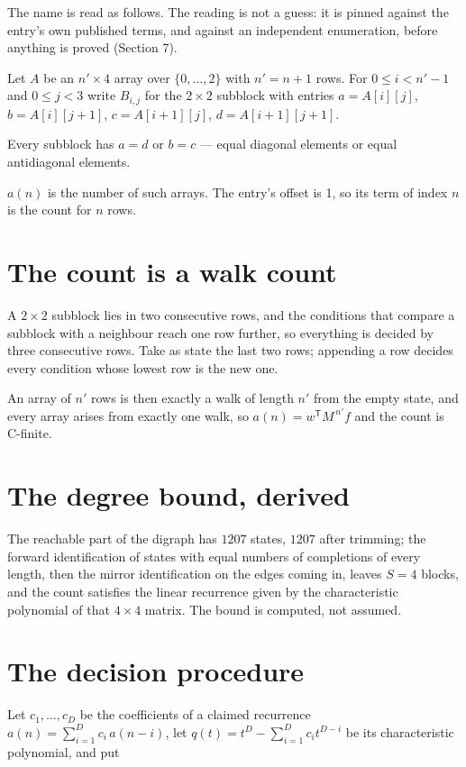 \documentclass[11pt]{article}
\theoremstyle{definition}
\begin{document}
The name is read as follows. The reading is not a guess: it is pinned against the entry's own published terms, and against an independent enumeration, before anything is proved (Section 7).

Let $A$ be an $n' \times 4$ array over $\{0,\dots,2\}$ with $n' = n + 1$ rows. For $0 \le i < n'-1$ and $0 \le j < 3$ write $B_{i,j}$ for the $2\times2$ subblock with entries $a = A[i][j]$, $b = A[i][j{+}1]$, $c = A[i{+}1][j]$, $d = A[i{+}1][j{+}1]$.

Every subblock has $a = d$ or $b = c$ --- equal diagonal elements or equal antidiagonal elements.

$a(n)$ is the number of such arrays. The entry's offset is 1, so its term of index $n$ is the count for $n$ rows.

\section{The count is a walk count}

A $2\times2$ subblock lies in two consecutive rows, and the conditions that compare a subblock with a neighbour reach one row further, so everything is decided by three consecutive rows. Take as state the last two rows; appending a row decides every condition whose lowest row is the new one.

An array of $n'$ rows is then exactly a walk of length $n'$ from the empty state, and every array arises from exactly one walk, so $a(n) = w^{\mathsf T}M^{\,n'}f$ and the count is C-finite.

\section{The degree bound, derived}

The reachable part of the digraph has $1207$ states, $1207$ after trimming; the forward identification of states with equal numbers of completions of every length, then the mirror identification on the edges coming in, leaves $S = 4$ blocks, and the count satisfies the linear recurrence given by the characteristic polynomial of that $4\times4$ matrix. The bound is computed, not assumed.

\section{The decision procedure}

Let $c_1,\dots,c_D$ be the coefficients of a claimed recurrence $a(n) = \sum_{i=1}^{D} c_i\,a(n-i)$, let $q(t) = t^{D} - \sum_{i=1}^{D} c_i t^{D-i}$ be its characteristic polynomial, and put
\end{document}
